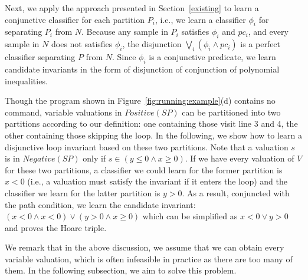 Next, we apply the approach presented in Section~\ref{existing} to learn a conjunctive classifier for each partition $P_i$, i.e., we learn a classifier $\phi_i$ for separating $P_i$ from $N$. Because any sample in $P_i$ satisfies $\phi_i$ and $pc_i$, and every sample in $N$ does not satisfies $\phi_i$, the disjunction $\bigvee_i (\phi_i \land pc_i)$ is a perfect classifier separating $P$ from $N$. Since $\phi_i$ is a conjunctive predicate, we learn candidate invariants in the form of disjunction of conjunction of polynomial inequalities.

\begin{example}
Though the program shown in Figure~\ref{fig:running:example}(d) contains no  command, variable valuations in $Positive(SP)$ can be partitioned into two partitions according to our definition: one containing those visit line 3 and 4, the other containing those skipping the loop. %
In the following, we show how to learn a disjunctive loop invariant based on these two partitions. Note that a valuation $s$ is in $Negative(SP)$ only if $s \in (y\leq 0 \land x \geq 0)$. If we have every valuation of $V$ for these two partitions, a classifier we could learn for the former partition is $x < 0$ (i.e., a valuation must satisfy the invariant if it enters the loop) and the classifier we learn for the latter partition is $y > 0$. As a result, conjuncted with the path condition, we learn the candidate invariant: $(x < 0 \land x < 0) \lor (y > 0 \land x \geq 0)$ which can be simplified as $x < 0 \lor y > 0$ and proves the Hoare triple.

We remark that in the above discussion, we assume that we can obtain every variable valuation, which is often infeasible in practice as there are too many of them. In the following subsection, we aim to solve this problem.
\end{example}

